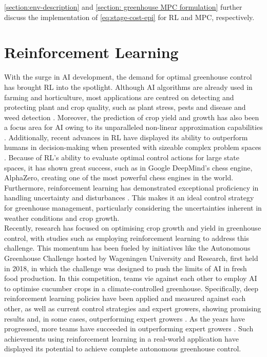  \cref{section:env-description} and \cref{section: greenhouse MPC formulation} further discuss the implementation of \autoref{eq:stage-cost-epi} for RL and MPC, respectively.


\section{Reinforcement Learning}\label{section:RL}

With the surge in AI development, the demand for optimal greenhouse control has brought RL into the spotlight. Although AI algorithms are already used in farming and horticulture, most applications are centred on detecting and protecting plant and crop quality, such as plant stress, pests and disease and weed detection \cite{hemmingCherryTomatoProduction2020}. Moreover, the prediction of crop yield and growth has also been a focus area for AI owing to its unparalleled non-linear approximation capabilities \cite{gongDeepLearningBased2021}. Additionally, recent advances in RL have displayed its ability to outperform humans in decision-making when presented with sizeable complex problem spaces \cite{bonsaiWhyReinforcementLearning2017}. Because of RL's ability to evaluate optimal control actions for large state spaces, it has shown great success, such as in Google DeepMind's chess engine, AlphaZero, creating one of the most powerful chess engines in the world. Furthermore, reinforcement learning has demonstrated exceptional proficiency in handling uncertainty and disturbances \cite{daaboulUncertaintyPredictionModelbased2020}. This makes it an ideal control strategy for greenhouse management, particularly considering the uncertainties inherent in weather conditions and crop growth. \\

Recently, research has focused on optimising crop growth and yield in greenhouse control, with studies such as \cite{ajagekarDeepReinforcementLearning2022,wangDeepReinforcementLearning2020,ajagekarEnergyefficientAIbasedControl2023,decardi-nelsonbenjaminImprovingResourceUse2023,zhangRobustModelbasedReinforcement2021,jansenOptimalControlLettuce2023,vanmourikPlantPerformancePrecision2023} employing reinforcement learning to address this challenge. This momentum has been fueled by initiatives like the Autonomous Greenhouse Challenge hosted by Wageningen University and Research, first held in 2018, in which the challenge was designed to push the limits of AI in fresh food production. In this competition, teams vie against each other to employ AI to optimise cucumber crops in a climate-controlled greenhouse. Specifically, deep reinforcement learning policies have been applied and measured against each other, as well as current control strategies and expert growers, showing promising results and, in some cases, outperforming expert growers \cite{vandenbemdRobustDeepReinforcement,wangDeepReinforcementLearning2020}. As the years have progressed, more teams have succeeded in outperforming expert growers \cite{vandenbemdRobustDeepReinforcement,hemmingCherryTomatoProduction2020}. Such achievements using reinforcement learning in a real-world application have displayed its potential to achieve complete autonomous greenhouse control.


